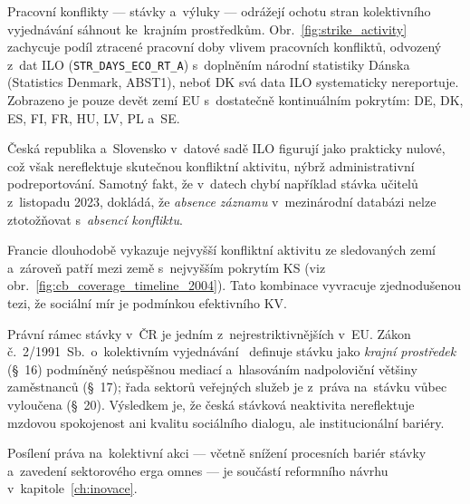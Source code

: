 
Pracovní konflikty --- stávky a~výluky --- odrážejí ochotu stran kolektivního
vyjednávání sáhnout ke~krajním prostředkům.
Obr.~\ref{fig:strike_activity} zachycuje podíl ztracené pracovní doby
vlivem pracovních konfliktů, odvozený z~dat \ac{ILO}
(\texttt{STR\_DAYS\_ECO\_RT\_A}) s~doplněním národní statistiky Dánska
(Statistics Denmark, ABST1), neboť DK svá data \ac{ILO} systematicky
nereportuje.
Zobrazeno je pouze devět zemí \ac{EU} s~dostatečně kontinuálním pokrytím:
DE, DK, ES, FI, FR, HU, LV, PL a~SE.



Česká republika a~Slovensko v~datové sadě \ac{ILO} figurují jako prakticky
nulové, což však nereflektuje skutečnou konfliktní aktivitu, nýbrž
administrativní podreportování.
Samotný fakt, že v~datech chybí například stávka učitelů z~listopadu 2023,
dokládá, že \emph{absence záznamu} v~mezinárodní databázi nelze ztotožňovat
s~\emph{absencí konfliktu}.

Francie dlouhodobě vykazuje nejvyšší konfliktní aktivitu ze sledovaných zemí
a~zároveň patří mezi země s~nejvyšším pokrytím \ac{KS}
(viz obr.~\ref{fig:cb_coverage_timeline_2004}).
Tato kombinace vyvracuje zjednodušenou tezi, že sociální mír je podmínkou
efektivního \ac{KV}.

Právní rámec stávky v~ČR je jedním z~nejrestriktivnějších v~\ac{EU}.
Zákon č.~2/1991~Sb.\ o~kolektivním vyjednávání~\cite{zakon_kv_1991}
definuje stávku jako \emph{krajní prostředek} (§~16) podmíněný neúspěšnou
mediací a~hlasováním nadpoloviční většiny zaměstnanců (§~17); řada sektorů
veřejných služeb je z~práva na~stávku vůbec vyloučena (§~20).
Výsledkem je, že česká stávková neaktivita nereflektuje mzdovou spokojenost
ani kvalitu sociálního dialogu, ale institucionální bariéry.

Posílení práva na~kolektivní akci --- včetně snížení procesních bariér stávky
a~zavedení sektorového erga omnes --- je součástí reformního návrhu
v~kapitole~\ref{ch:inovace}.
